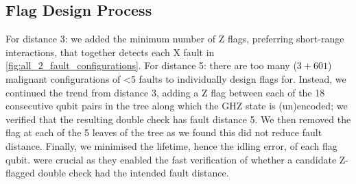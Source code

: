 \subsection{Flag Design Process}\label{sec:flag_design_process}
For distance 3:
we added the minimum number of Z flags,
preferring short-range interactions,
that together detects each X fault in \cref{fig:all_2_fault_configurations}.
For distance 5:
there are too many ($3 +601$) malignant configurations of \num{<5} faults
to individually design flags for.
Instead,
we continued the trend from distance 3,
adding a Z flag between each of the 18 consecutive qubit pairs
in the tree along which the GHZ state is (un)encoded;
we verified that the resulting double check has fault distance 5.
We then removed the flag at each of the 5 leaves of the tree
as we found this did not reduce fault distance.
Finally,
we minimised the lifetime, hence the idling error, of each flag qubit.
were crucial as they enabled the fast verification of whether
a candidate Z-flagged double check had the intended fault distance.